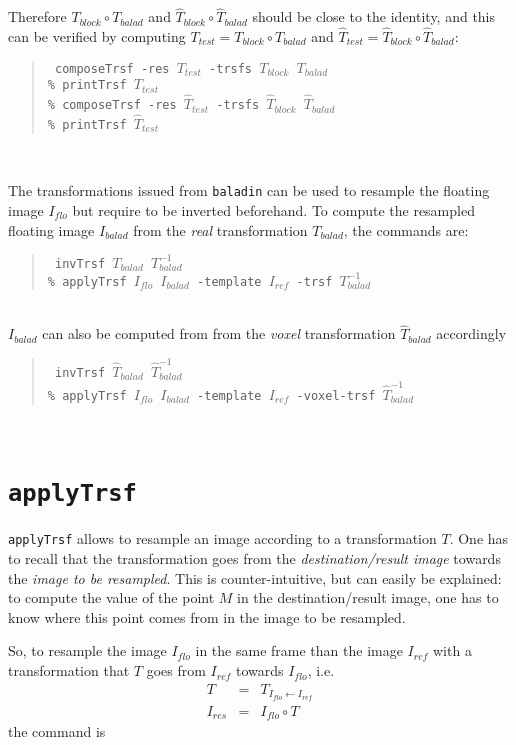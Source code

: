 \documentclass[10pt]{report}
\def\applyTrsf{\texttt{applyTrsf} }
\def\baladin{\texttt{baladin} }
\def\composeTrsf{\texttt{composeTrsf} }
\def\invTrsf{\texttt{invTrsf} }
\def\printTrsf{\texttt{printTrsf} }
\newenvironment{code}[1]{\mbox{}\\[1ex]\hspace*{-#1cm}\begin{minipage}{150mm}\begin{quote}\tt}{\end{quote}\end{minipage}\mbox{}\\[1ex]}
\begin{document}
Therefore $T_{block} \circ T_{balad}$ and $\hat{T}_{block} \circ \hat{T}_{balad}$ should be close to the identity, and this can be verified by computing $T_{test} = T_{block} \circ T_{balad}$
and $\hat{T}_{test} = \hat{T}_{block} \circ \hat{T}_{balad}$:
\begin{code}{0.8}
\% \composeTrsf -res $T_{test}$ -trsfs $T_{block}$ $T_{balad}$ \\
\% \printTrsf $T_{test}$\\
\% \composeTrsf -res $\hat{T}_{test}$ -trsfs $\hat{T}_{block}$ $\hat{T}_{balad}$\\
\% \printTrsf $\hat{T}_{test}$\\
\end{code}

The transformations issued from \baladin can be used to resample the floating image $I_{flo}$ but require to be inverted beforehand. To compute the resampled floating image $I_{balad}$ from the \textit{real} transformation $T_{balad}$, the commands are:
\begin{code}{0.8}
\% \invTrsf $T_{balad}$ $T^{-1}_{balad}$ \\
\% \applyTrsf $I_{flo}$ $I_{balad}$ -template $I_{ref}$ -trsf $T^{-1}_{balad}$
\end{code}
$I_{balad}$ can also be computed from from the \textit{voxel} transformation $\hat{T}_{balad}$ accordingly
\begin{code}{0.8}
\% \invTrsf $\hat{T}_{balad}$ $\hat{T}^{-1}_{balad}$ \\
\% \applyTrsf $I_{flo}$ $I_{balad}$ -template $I_{ref}$ -voxel-trsf $\hat{T}^{-1}_{balad}$
\end{code}






\section{\applyTrsf}

\applyTrsf allows to resample an image according to a transformation $T$. One has to recall that the transformation goes from the \textit{destination/result image} towards the \textit{image to be resampled}. This is counter-intuitive, but can easily be explained: to compute the value of the point $M$ in the destination/result image, one has to know where this point comes from in the image to be resampled.

So, to resample the image $I_{flo}$ in the same frame than the image $I_{ref}$ with a transformation that $T$ goes from $I_{ref}$ towards $I_{flo}$, i.e. 
\begin{eqnarray*}
T & = & T_{I_{flo} \leftarrow I_{ref}} \\
I_{res} & = & I_{flo} \circ T
\end{eqnarray*}
 the command is  
\end{document}
